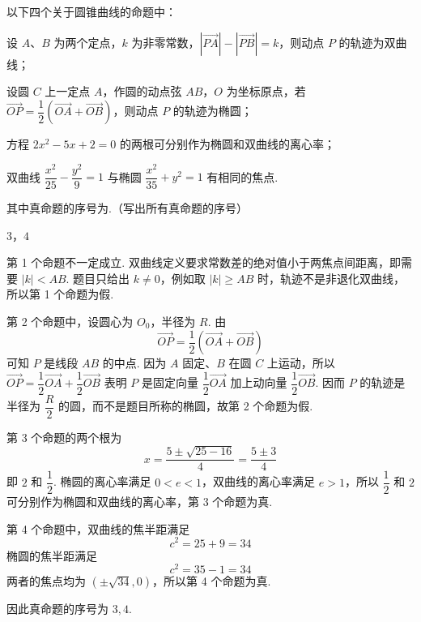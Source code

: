 \begin{problem}
以下四个关于圆锥曲线的命题中：

\begin{circlelist}
\item 设 \(A\)、\(B\) 为两个定点，\(k\) 为非零常数，\(\left|\overrightarrow{PA}\right|-\left|\overrightarrow{PB}\right|=k\)，则动点 \(P\) 的轨迹为双曲线；
\item 设圆 \(C\) 上一定点 \(A\)，作圆的动点弦 \(AB\)，\(O\) 为坐标原点，若 \(\overrightarrow{OP}=\dfrac12\left(\overrightarrow{OA}+\overrightarrow{OB}\right)\)，则动点 \(P\) 的轨迹为椭圆；
\item 方程 \(2x^2-5x+2=0\) 的两根可分别作为椭圆和双曲线的离心率；
\item 双曲线 \(\dfrac{x^2}{25}-\dfrac{y^2}{9}=1\) 与椭圆 \(\dfrac{x^2}{35}+y^2=1\) 有相同的焦点.
\end{circlelist}

其中真命题的序号为\fillinblank{}.（写出所有真命题的序号）
\end{problem}

\begin{answer}
\(3\)，\(4\)
\end{answer}

\begin{solution}
第 1 个命题不一定成立. 双曲线定义要求常数差的绝对值小于两焦点间距离，即需要 \(|k|<AB\). 题目只给出 \(k\neq0\)，例如取 \(|k|\geqslant AB\) 时，轨迹不是非退化双曲线，所以第 1 个命题为假.

第 2 个命题中，设圆心为 \(O_0\)，半径为 \(R\). 由
\[
\overrightarrow{OP}=\frac12\left(\overrightarrow{OA}+\overrightarrow{OB}\right)
\]
可知 \(P\) 是线段 \(AB\) 的中点. 因为 \(A\) 固定、\(B\) 在圆 \(C\) 上运动，所以 \(\overrightarrow{OP}=\dfrac12\overrightarrow{OA}+\dfrac12\overrightarrow{OB}\) 表明 \(P\) 是固定向量 \(\dfrac12\overrightarrow{OA}\) 加上动向量 \(\dfrac12\overrightarrow{OB}\). 因而 \(P\) 的轨迹是半径为 \(\dfrac R2\) 的圆，而不是题目所称的椭圆，故第 2 个命题为假.

第 3 个命题的两个根为
\[
x=\frac{5\pm\sqrt{25-16}}4=\frac{5\pm3}{4}
\]
即 \(2\) 和 \(\dfrac12\). 椭圆的离心率满足 \(0<e<1\)，双曲线的离心率满足 \(e>1\)，所以 \(\dfrac12\) 和 \(2\) 可分别作为椭圆和双曲线的离心率，第 3 个命题为真.

第 4 个命题中，双曲线的焦半距满足
\[
c^2=25+9=34
\]
椭圆的焦半距满足
\[
c^2=35-1=34
\]
两者的焦点均为 \((\pm\sqrt{34},0)\)，所以第 4 个命题为真.

因此真命题的序号为 \(3,4\).
\end{solution}

